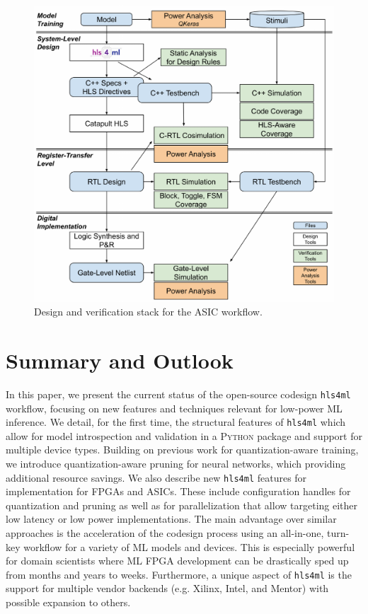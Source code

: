 \documentclass[tinyml]{acmart}
\newcommand{\hlsfml}{\texttt{hls4ml}\xspace}
\begin{document}

\begin{figure}[t!]
\centering
\includegraphics[width=0.9\columnwidth]{Figs/designMethodology.pdf}
\caption{Design and verification stack for the ASIC workflow.}
\label{fig:asic_workflow}
\end{figure}

\section{Summary and Outlook}
\label{sec:sum}

In this paper, we present the current status of the open-source codesign \hlsfml workflow, focusing on new features and techniques relevant for low-power ML inference.
We detail, for the first time, the structural features of \hlsfml which allow for model introspection and validation in a \textsc{Python} package and support for multiple device types.
Building on previous work for quantization-aware training, we introduce quantization-aware pruning for neural networks, which providing additional resource savings.
We also describe new \hlsfml features for implementation for FPGAs and ASICs.
These include configuration handles for quantization and pruning as well as for parallelization that allow targeting either low latency or low power implementations.
The main advantage over similar approaches is the acceleration of the codesign process using an all-in-one, turn-key workflow for a variety of ML models and devices.
This is especially powerful for domain scientists where ML FPGA development can be drastically sped up from months and years to weeks.
Furthermore, a unique aspect of \hlsfml is the support for multiple vendor backends (e.g. Xilinx, Intel, and Mentor) with possible expansion to others.
\end{document}
